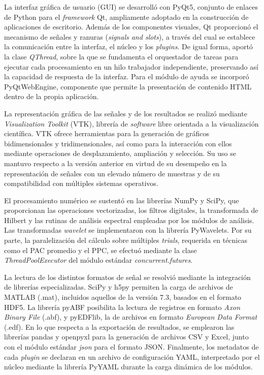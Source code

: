 \documentclass[12pt,letterpaper,oneside]{article}
\begin{document}
La interfaz gráfica de usuario (GUI) se desarrolló con PyQt5, conjunto de enlaces de Python para el \textit{framework} Qt, ampliamente adoptado en la construcción de aplicaciones de escritorio. Además de los componentes visuales, Qt proporcionó el mecanismo de señales y ranuras (\textit{signals and slots}), a través del cual se establece la comunicación entre la interfaz, el núcleo y los \textit{plugins}. De igual forma, aportó la clase \textit{QThread}, sobre la que se fundamenta el orquestador de tareas para ejecutar cada procesamiento en un hilo trabajador independiente, preservando así la capacidad de respuesta de la interfaz. Para el módulo de ayuda se incorporó PyQtWebEngine, componente que permite la presentación de contenido HTML dentro de la propia aplicación.

La representación gráfica de las señales y de los resultados se realizó mediante \textit{Visualization Toolkit} (VTK), librería de \textit{software} libre orientada a la visualización científica. VTK ofrece herramientas para la generación de gráficos bidimensionales y tridimensionales, así como para la interacción con ellos mediante operaciones de desplazamiento, ampliación y selección. Su uso se mantuvo respecto a la versión anterior en virtud de su desempeño en la representación de señales con un elevado número de muestras y de su compatibilidad con múltiples sistemas operativos.

El procesamiento numérico se sustentó en las librerías NumPy y SciPy, que proporcionan las operaciones vectorizadas, los filtros digitales, la transformada de Hilbert y las rutinas de análisis espectral empleadas por los módulos de análisis. Las transformadas \textit{wavelet} se implementaron con la librería PyWavelets. Por su parte, la paralelización del cálculo sobre múltiples \textit{trials}, requerida en técnicas como el PAC promedio y el PPC, se efectuó mediante la clase \textit{ThreadPoolExecutor} del módulo estándar \textit{concurrent.futures}.

La lectura de los distintos formatos de señal se resolvió mediante la integración de librerías especializadas. SciPy y h5py permiten la carga de archivos de MATLAB (.mat), incluidos aquellos de la versión 7.3, basados en el formato HDF5. La librería pyABF posibilita la lectura de registros en formato \textit{Axon Binary File} (.abf), y pyEDFlib, la de archivos en formato \textit{European Data Format} (.edf). En lo que respecta a la exportación de resultados, se emplearon las librerías pandas y openpyxl para la generación de archivos CSV y Excel, junto con el módulo estándar \textit{json} para el formato JSON. Finalmente, los metadatos de cada \textit{plugin} se declaran en un archivo de configuración YAML, interpretado por el núcleo mediante la librería PyYAML durante la carga dinámica de los módulos.
\end{document}
